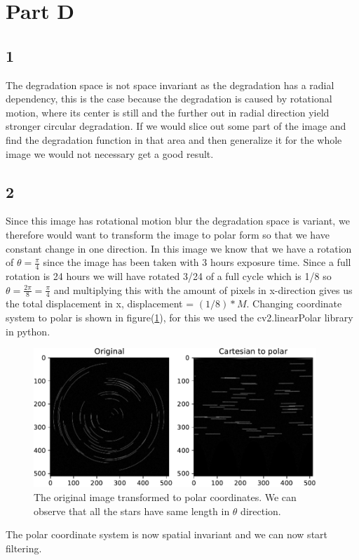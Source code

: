 {\section{Part D}
\subsection{1}

The degradation space is not space invariant as the degradation has a radial dependency, this is the case because the degradation is caused by rotational motion, where its center is still and the further out in radial direction yield stronger circular degradation. If we would slice out some part of the image and find the degradation function in that area and then generalize it for the whole image we would not necessary get a good result.


\subsection{2}

Since this image has rotational motion blur the degradation space is variant, we therefore would want to transform the image to polar form so that we have constant change in one direction. In this image we know that we have a rotation of $\theta = \frac{\pi}{4}$ since the image has been taken with 3 hours exposure time. Since a full rotation is 24 hours we will have rotated 3/24 of a full cycle which is 1/8 so $\theta = \frac{2\pi}{8} = \frac{\pi}{4}$ and multiplying this with the amount of pixels in x-direction gives us the total displacement in x, displacement = $(1/8)*M$. Changing coordinate system to polar is shown in figure(\ref{changingsystem}), for this we used the cv2.linearPolar library in python.


\begin{figure}[!htb]
    {\centering
        \includegraphics[width=0.95\textwidth]{carttopol.pdf}
        \caption{The original image transformed to polar coordinates. We can observe that all the stars have same length in $\theta$ direction.}
        \label{changingsystem}
    \par}
    \end{figure}
The polar coordinate system is now spatial invariant and we can now start filtering.

}

